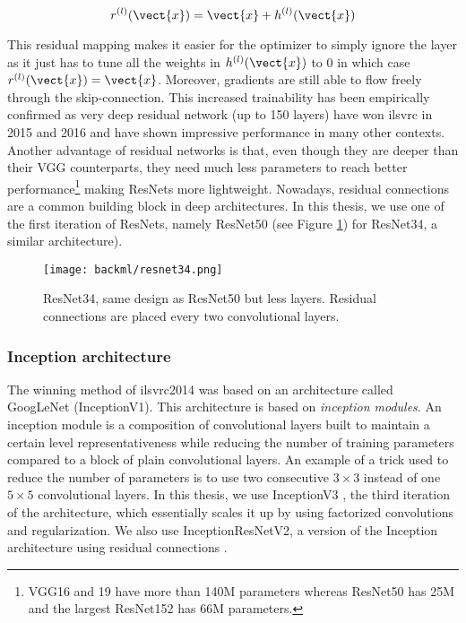 \begin{equation}
\label{eqn:backml:residual}
r^{(l)}(\vect{x}) = \vect{x} + h^{(l)}(\vect{x})
\end{equation}

This residual mapping makes it easier for the optimizer to simply ignore the layer as it just has to tune all the weights in $h^{(l)}(\vect{x})$ to 0 in which case $r^{(l)}(\vect{x}) = \vect{x}$. Moreover, gradients are still able to flow freely through the skip-connection. This increased trainability has been empirically confirmed as very deep residual network (up to 150 layers) have won \acrshort{ilsvrc} in 2015 and 2016 and have shown impressive performance in many other contexts. Another advantage of residual networks is that, even though they are deeper than their VGG counterparts, they need much less parameters to reach better performance\footnote{VGG16 and 19 have more than 140M parameters whereas ResNet50 has 25M and the largest ResNet152 has 66M parameters.} making ResNets more lightweight. Nowadays, residual connections are a common building block in deep architectures. In this thesis, we use one of the first iteration of ResNets, namely ResNet50 (see Figure \ref{fig:backml:resnet}) for ResNet34, a similar architecture). 

\begin{figure}
  \centering
  \texttt{[image: backml/resnet34.png]}
  \caption{ResNet34, same design as ResNet50 but less layers. Residual connections are placed every two convolutional layers.}
  \label{fig:backml:resnet}
\end{figure}

\subsubsection{Inception architecture}
\label{sssec:backml:arch:inception}
The winning method of \acrshort{ilsvrc}2014 was based on an architecture called GoogLeNet \parencite{szegedy2015going} (\aka InceptionV1). This architecture is based on \textit{inception modules}. An inception module is a composition of convolutional layers built to maintain a certain level representativeness while reducing the number of training parameters compared to a block of plain convolutional layers. An example of a trick used 
to reduce the number of parameters is to use two consecutive $3 \times 3$ instead of one $5 \times 5$ convolutional layers. In this thesis, we use InceptionV3 \parencite{szegedy2016rethinking}, the third iteration of the architecture, which essentially scales it up by using factorized convolutions and regularization. We also use InceptionResNetV2, a version of the Inception architecture using residual connections \parencite{szegedy2017inception}. 


